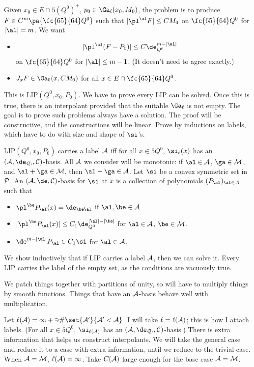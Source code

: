 

Given $x_0\in E\cap 5(Q^0)^+$, $p_0\in \Ga_\ell(x_0,M_0)$, the problem is to produce $F\in C^m \pa{\fc{65}{64} Q^0}$ such that $|\pl^\al F|\le CM_0$ on $\fc{65}{64}Q^0$ for $|\al|=m$. We want
\begin{itemize}
\item
\begin{align}
|\pl^\al(F-P_0)|&\le C\de_{Q^0}^{m-|\al|}
\end{align}
on $\fc{65}{64}Q^0$ for $|\al|\le m-1$. 
(It doesn't need to agree exactly.)
\item
$J_xF\in \Ga_0(x,CM_0)$ for all $x\in E\cap \fc{65}{64}Q^0$. 
\end{itemize}
This is LIP$(Q^0,x_0,P_0)$. We have to prove every LIP can be solved. Once this is true, there is an interpolant provided that the suitable $\Ga_\ell$ is not empty. The goal is to prove such problems always have a solution. The proof will be constructive, and the constructions will be linear. %
Prove by inductions on labels, which have to do with size and shape of $\si$'s. 

LIP$(Q^0,x_0,P_0)$ carries a label $\cal A$ iff for all $x\in 5Q^0$, $\si_\ell(x)$ has an $(\cal A, \de_{Q_0}, C)$-basis. %
All $\cal A$ we consider will be monotonic: if $\al\in \cal A$, $\ga\in \cal M$, and $\al+\ga\in \cal M$, then $\al+\ga\in \cal A$. 
Let $\si$ be a convex symmetric set in $\cal P$. An $(\cal A, \de, C)$-basis for $\si$ at $x$ is a collection of polynomials $(P_\al)_{\al\in \cal A}$ such that 
\begin{itemize}
\item
$\pl^\be P_\al(x)=\de_{\be \al}$ if $\al,\be\in \cal A$
\item
$|\pl^\be P_\al(x)|\le C_1  \de_{Q^0}^{|\al|-|\be|}$ for $\al\in \cal A$, $\be \in \cal M$.
\item
$\de^{m-|\al|}P_\al \in C_1\si$ for $\al\in \cal A$. 
\end{itemize}
We show inductively that if LIP carries a label $\cal A$, then we can solve it. 
Every LIP carries the label of the empty set, as the conditions are vacuously true. 

We patch things together with partitions of unity, so will have to multiply things by smooth functions. Things that have an $\cal A$-basis behave well with multiplication. %

Let $\ell(\cal A) = 1+3\#\set{\cal A'}{\cal A'<\cal A}$. I will take $\ell=\ell(\cal A)$; this is how I attach labels. (For all $x\in 5Q^0$, $\si_{\ell(\cal A)}$ has an $(\cal A, \de_{Q_0},C)$-basis.) There is extra information that helps us construct interpolants. We will take the general case and reduce it to a case with extra information, until we reduce to the trivial case. When $\cal A=\cal M$, $\ell(\cal A)=1$. Take $C(\cal A)$ large enough for the base case $\cal A=\cal M$. %

